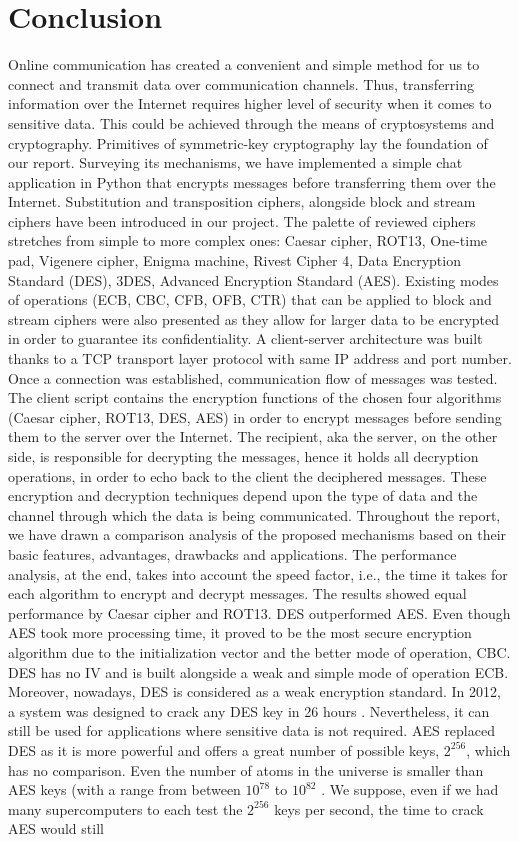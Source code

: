 \section{Conclusion}

Online communication has created a convenient and simple method for us to connect and transmit data over communication channels. Thus, transferring information over the Internet requires higher level of security when it comes to sensitive data. This could be achieved through the means of cryptosystems and cryptography. Primitives of symmetric-key cryptography lay the foundation of our report. Surveying its mechanisms, we have implemented a simple chat application in Python that encrypts messages before transferring them over the Internet. Substitution and transposition ciphers, alongside block and stream ciphers have been introduced in our project. The palette of reviewed ciphers stretches from simple to more complex ones: Caesar cipher, ROT13, One-time pad, Vigenere cipher, Enigma machine, Rivest Cipher 4, Data Encryption Standard (DES), 3DES, Advanced Encryption Standard (AES). Existing modes of operations (ECB, CBC, CFB, OFB, CTR) that can be applied to block and stream ciphers were also presented as they allow for larger data to be encrypted in order to guarantee its confidentiality. A client-server architecture was built thanks to a TCP transport layer protocol with same IP address and port number. Once a connection was established, communication flow of messages was tested. The client script contains the encryption functions of the chosen four algorithms (Caesar cipher, ROT13, DES, AES) in order to encrypt messages before sending them to the server over the Internet. The recipient, aka the server, on the other side, is responsible for decrypting the messages, hence it holds all decryption operations, in order to echo back to the client the deciphered messages. These encryption and decryption techniques depend upon the type of data and the channel through which the data is being communicated. Throughout the report, we have drawn a comparison analysis of the proposed mechanisms based on their basic features, advantages, drawbacks and applications. The performance analysis, at the end, takes into account the speed factor, i.e., the time it takes for each algorithm to encrypt and decrypt messages. The results showed equal performance by Caesar cipher and ROT13. DES outperformed AES. Even though AES took more processing time, it proved to be the most secure encryption algorithm due to the initialization vector and the better mode of operation, CBC. DES has no IV and is built alongside a weak and simple mode of operation ECB. Moreover, nowadays, DES is considered as a weak encryption standard. In 2012, a system was designed to crack any DES key in 26 hours \cite{crack.sh}. Nevertheless, it can still be used for applications where sensitive data is not required. AES replaced DES as it is more powerful and offers a great number of possible keys, $2^{256}$, which has no comparison. Even the number of atoms in the universe is smaller than AES keys (with a range from between $10^{78}$ to $10^{82}$ \cite{atoms}. We suppose, even if we had many supercomputers to each test the $2^{256}$ keys per second, the time to crack AES would still 
